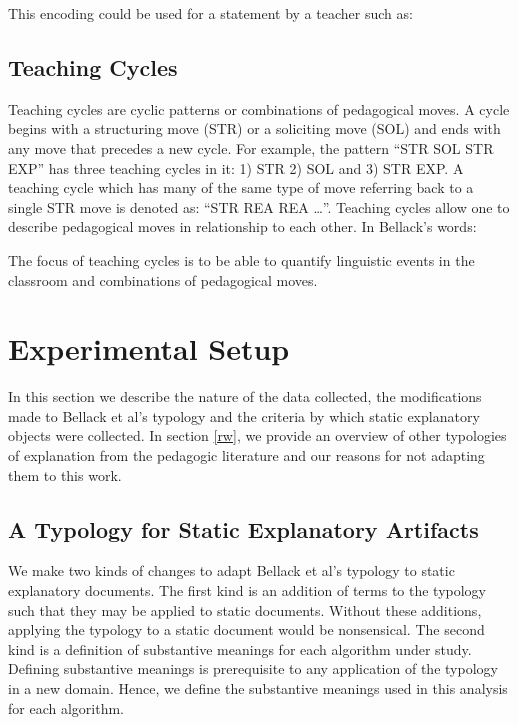 \documentclass[conference]{IEEEtran}
\begin{document}
This encoding could be used for a statement by a teacher such as:


\subsection{Teaching Cycles}
Teaching cycles are cyclic patterns or combinations of pedagogical moves. A
cycle begins with a structuring move (STR) or a soliciting move (SOL) and ends
with any move that precedes a new cycle. For example, the pattern ``STR SOL STR
EXP'' has three teaching cycles in it: 1) STR 2) SOL and 3) STR EXP. A teaching
cycle which has many of the same type of move referring back to a single STR
move is denoted as: ``STR REA REA \ldots''. Teaching cycles allow one to
describe pedagogical moves in relationship to each other. In Bellack's words:


The focus of teaching cycles is to be able to quantify linguistic events in the
classroom and combinations of pedagogical moves. 

\section{Experimental Setup}
In this section we describe the nature of the data collected, the modifications
made to Bellack et al's typology and the criteria by which static explanatory
objects were collected. In section \ref{rw}, we provide an overview of other
typologies of explanation from the pedagogic literature and our reasons for not
adapting them to this work. 

\subsection{A Typology for Static Explanatory Artifacts}
We make two kinds of changes to adapt Bellack et al's typology to static
explanatory documents. The first kind is an addition of terms to the typology
such that they may be applied to static documents. Without these additions,
applying the typology to a static document would be nonsensical. The second kind
is a definition of substantive meanings for each algorithm under study.
Defining substantive meanings is prerequisite to any application of the typology
in a new domain. Hence, we define the substantive meanings used in this analysis
for each algorithm.
\end{document}
